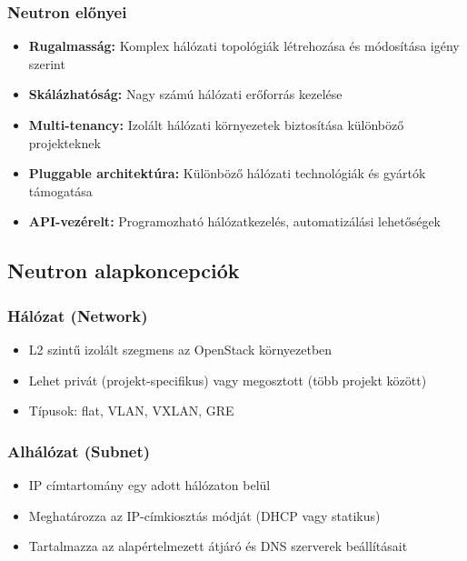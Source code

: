 \documentclass[a4paper,12pt]{article}
\begin{document}
    \subsubsection{Neutron előnyei}

    \begin{itemize}
        \item \textbf{Rugalmasság:} Komplex hálózati topológiák létrehozása és módosítása igény szerint
        \item \textbf{Skálázhatóság:} Nagy számú hálózati erőforrás kezelése
        \item \textbf{Multi-tenancy:} Izolált hálózati környezetek biztosítása különböző projekteknek
        \item \textbf{Pluggable architektúra:} Különböző hálózati technológiák és gyártók támogatása
        \item \textbf{API-vezérelt:} Programozható hálózatkezelés, automatizálási lehetőségek
    \end{itemize}

    \subsection{Neutron alapkoncepciók}

    \subsubsection{Hálózat (Network)}

    \begin{itemize}
        \item L2 szintű izolált szegmens az OpenStack környezetben
        \item Lehet privát (projekt-specifikus) vagy megosztott (több projekt között)
        \item Típusok: flat, VLAN, VXLAN, GRE
    \end{itemize}

    \subsubsection{Alhálózat (Subnet)}

    \begin{itemize}
        \item IP címtartomány egy adott hálózaton belül
        \item Meghatározza az IP-címkiosztás módját (DHCP vagy statikus)
        \item Tartalmazza az alapértelmezett átjáró és DNS szerverek beállításait
    \end{itemize}
\end{document}
